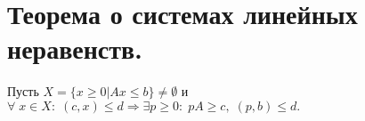 \chapter{Теорема о системах линейных неравенств.}\label{cha:15}

\begin{theorem}
	Пусть $X = \{ x \geq 0 | Ax \leq b\} \neq \emptyset$ и $\forall \; x \in X: \; (c, x) \leq d \Rightarrow \exists p \geq 0: \; pA \geq c, \; (p, b) \leq d.$
\end{theorem}

